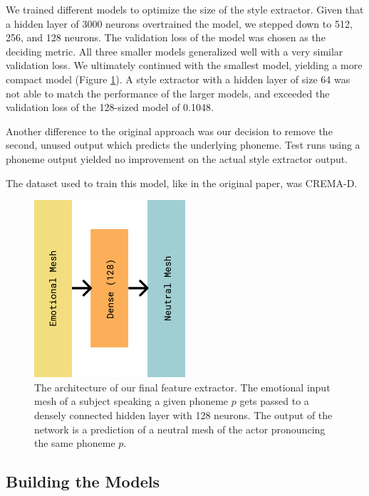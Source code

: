 We trained different models to optimize the size of the style extractor. Given that a hidden layer of 3000 neurons overtrained the model, we stepped down to 512, 256, and 128 neurons. The validation loss of the model was chosen as the deciding metric. 
All three smaller models generalized well with a very similar validation loss. We ultimately continued with the smallest model, yielding a more compact model (Figure \ref{fig:fextractor}). A style extractor with a hidden layer of size 64 was not able to match the performance of the larger models, and exceeded the validation loss of the 128-sized model of 0.1048.

Another difference to the original approach was our decision to remove the second, unused output which predicts the underlying phoneme. Test runs using a phoneme output yielded no improvement on the actual style extractor output.

The dataset used to train this model, like in the original paper, was CREMA-D.

\begin{figure}
    \centering
    \includegraphics[width=0.5\textwidth]{res/FExtractor.pdf}
    \caption{The architecture of our final feature extractor. The emotional input mesh of a subject speaking a given phoneme $p$ gets passed to a densely connected hidden layer with 128 neurons. The output of the network is a prediction of a neutral mesh of the actor pronouncing the same phoneme $p$.}
    \label{fig:fextractor}
\end{figure}

\subsection{Building the Models}
\label{sec:building}

